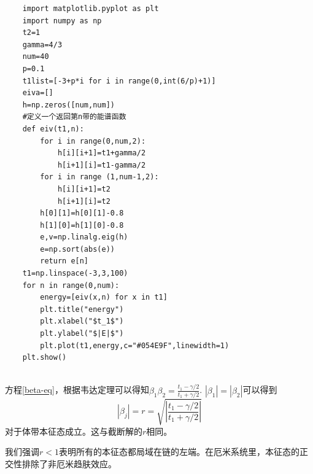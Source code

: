 \documentclass{article}
\begin{document}
\begin{lstlisting}
    import matplotlib.pyplot as plt
    import numpy as np
    t2=1
    gamma=4/3
    num=40
    p=0.1
    t1list=[-3+p*i for i in range(0,int(6/p)+1)]
    eiva=[]
    h=np.zeros([num,num])
    #定义一个返回第n带的能谱函数
    def eiv(t1,n):
        for i in range(0,num,2):
            h[i][i+1]=t1+gamma/2
            h[i+1][i]=t1-gamma/2
        for i in range (1,num-1,2):
            h[i][i+1]=t2
            h[i+1][i]=t2
        h[0][1]=h[0][1]-0.8
        h[1][0]=h[1][0]-0.8
        e,v=np.linalg.eig(h)
        e=np.sort(abs(e))
        return e[n]
    t1=np.linspace(-3,3,100)
    for n in range(0,num):
        energy=[eiv(x,n) for x in t1]
        plt.title("energy") 
        plt.xlabel("$t_1$") 
        plt.ylabel("$|E|$") 
        plt.plot(t1,energy,c="#054E9F",linewidth=1)
    plt.show()
    
\end{lstlisting}
方程\eqref{beta-eq}，根据韦达定理可以得知$\beta_1\beta_2=\frac{t_1-\gamma/2}{t_1+\gamma/2}$. $|\beta_1|=|\beta_2|$可以得到
\begin{equation}
    |\beta_j|=r=\sqrt{\left|\frac{t_1-\gamma/2}{t_1+\gamma/2}\right|}
\end{equation}
对于体带本征态成立。这与截断解的$r$相同。

我们强调$r<1$表明所有的本征态都局域在链的左端。在厄米系统里，本征态的正交性排除了非厄米趋肤效应。
\end{document}
